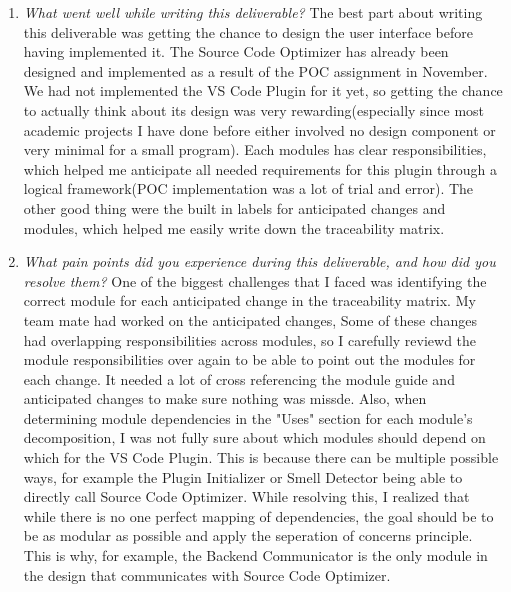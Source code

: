 \documentclass[12pt, titlepage]{article}
\begin{document}
\begin{enumerate}
  \item \textit{What went well while writing this deliverable? }
  The best part about writing this deliverable was getting the chance to design the user interface before having implemented it. The Source Code Optimizer has already been designed
  and implemented as a result of the POC assignment in November. We had not implemented the VS Code Plugin for it yet, so getting the chance to actually think about its 
  design was very rewarding(especially since most academic projects I have done before either involved no design component or very minimal for a small program). Each modules has clear 
  responsibilities, which helped me anticipate all needed requirements for this plugin through a logical framework(POC implementation was a lot of trial and error).
  The other good thing were the built in labels for anticipated changes and modules, which helped me easily write down the traceability matrix.
  
  \item \textit{What pain points did you experience during this deliverable, and how did you resolve them?}
  One of the biggest challenges that I faced was identifying the correct module for each anticipated change in the traceability matrix. My team mate had worked on the anticipated
  changes, Some of these changes had overlapping responsibilities across modules, so I carefully reviewd the module responsibilities over again to be able to point out the modules for 
  each change. It needed a lot of cross referencing the module guide and anticipated changes to make sure nothing was missde. 
  Also, when determining module dependencies in the "Uses" section for each module's decomposition, I was not fully sure about which modules should depend on which for the VS Code Plugin.
  This is because there can be multiple possible ways, for example the Plugin Initializer or Smell Detector being able to directly call Source Code Optimizer. While resolving this, I realized that 
  while there is no one perfect mapping of dependencies, the goal should be to be as modular as possible and apply the seperation of concerns principle. This is why, for example, the Backend Communicator 
  is the only module in the design that communicates with Source Code Optimizer.
\end{enumerate}
\end{document}
